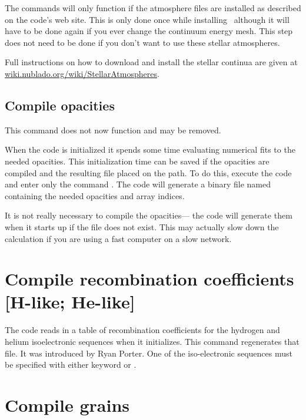 The  commands will only function
if the atmosphere files
are installed as described on the code's web site.
This is only done once
while installing \Cloudy\ although it will have to be
done again if you ever
change the continuum energy mesh.
This step does not need to be done if
you don't want to use these stellar atmospheres.

Full instructions on how to download and install the stellar continua
are given at
\href{http://wiki.nublado.org/wiki/StellarAtmospheres}{wiki.nublado.org/wiki/StellarAtmospheres}.

\begin{shaded}
\section{Compile opacities}

 This command does not now function and may be removed.

When the code is initialized it spends some time evaluating numerical
fits to the needed opacities.
This initialization time can be saved if
the opacities are compiled and the resulting file placed on the path.
To
do this, execute the code and enter only the command
.
The code will generate a binary file named 
containing the needed opacities and array indices.

  It is not really necessary to compile the opacities---
the code
will generate them when it starts up if the file does not exist.
This may
actually slow down the calculation if you are using a fast computer on a
slow network.
\end{shaded}

\section{Compile recombination coefficients [H-like; He-like]}

The code reads in a table of recombination coefficients for the hydrogen and
helium isoelectronic sequences when it initializes.
This command regenerates that file.
It was
introduced by Ryan Porter.
One of the iso-electronic sequences must be
specified with either keyword  or .

\section{Compile grains}
\label{sec:CompileGrains}

